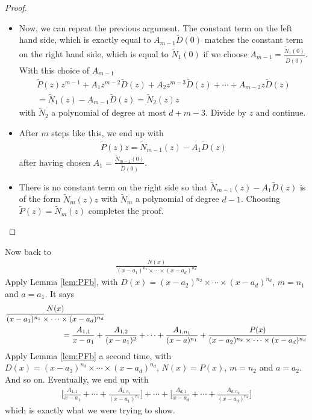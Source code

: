 \begin{proof}
\begin{itemize}
\item Now, we can repeat the previous argument. The constant term on the left
hand side, which is exactly equal to $A_{m-1}\tilde D(0)$ matches the constant term
on the right hand side, which is equal to $\tilde N_1(0)$ if we choose
$A_{m-1}=\frac{\tilde N_1(0)}{\tilde D(0)}$. With this choice of $A_{m-1}$
\begin{multline*}
\tilde P(z) z^{m-1}+A_1z^{m-2}\tilde D(z)+A_2z^{m-3}\tilde D(z)+\cdots
+A_{m-2} z\tilde D(z)\\
=\tilde N_1(z)-A_{m-1}\tilde D(z)=\tilde N_2(z)z
\end{multline*}
with $\tilde N_2$ a polynomial of degree at most $d+m-3$.
Divide by $z$ and continue.

\item After $m$ steps like this, we end up with
\begin{align*}
\tilde P(z) z=\tilde N_{m-1}(z)-A_1\tilde D(z)
\end{align*}
after having chosen $A_1=\frac{\tilde N_{m-1}(0)}{\tilde D(0)}$.

\item There is no constant term on the right side so that $\tilde N_{m-1}(z)-A_1\tilde
D(z)$ is of the form $\tilde N_m(z) z$ with $\tilde N_m$ a polynomial
of degree $d-1$. Choosing $\tilde P(z)=\tilde N_m(z)$ completes
the proof.
\end{itemize}
\end{proof}


Now back to
\begin{align*}
\frac{N(x)}{(x-a_1)^{n_1}\times\cdots\times (x-a_d)^{n_d}}
\end{align*}
Apply Lemma \ref{lem:PFb}, with
$D(x)=(x-a_2)^{n_2}\times\cdots\times (x-a_d)^{n_d}$,
$m=n_1$ and $a=a_1$. It says
\begin{align*}
&\frac{N(x)}{(x-a_1)^{n_1}\times\cdots\times (x-a_d)^{n_d}} \\
&\hskip1in =\frac{A_{1,1}}{x-a_1}+\frac{A_{1,2}}{(x-a_1)^2}+\cdots
+\frac{A_{1,n_1}}{(x-a)^{n_1}}
+\frac{P(x)}{(x-a_2)^{n_2}\times\cdots\times (x-a_d)^{n_d}}
\end{align*}
Apply Lemma \ref{lem:PFb} a second time, with
$D(x)=(x-a_3)^{n_3}\times\cdots\times (x-a_d)^{n_d}$, $N(x)=P(x)$, $m=n_2$ and
$a=a_2$.
And so on. Eventually, we end up with
\begin{align*}
\Big[\frac{A_{1,1}}{x-a_1}+\cdots+\frac{A_{1,n_1}}{(x-a_1)^{n_1}}\Big]+\cdots+
\Big[\frac{A_{d,1}}{x-a_d}+\cdots+\frac{A_{d,n_d}}{(x-a_d)^{n_d}}\Big]
\end{align*}
which is exactly what we were trying to show.

